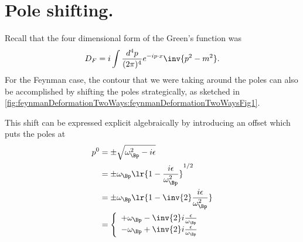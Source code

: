 %
%
\section{Pole shifting.}

Recall that the four dimensional form of the Green's function was
\begin{equation}\label{eqn:qftLecture13:400}
D_F = i \int \frac{d^4 p}{(2 \pi)^4} e^{-i p \cdot x} \inv{ p^2 - m^2 }.
\end{equation}
For the Feynman case, the contour that we were taking around the poles can also be accomplished by shifting the poles strategically, as sketched in \cref{fig:feynmanDeformationTwoWays:feynmanDeformationTwoWaysFig1}.


This shift can be expressed explicit algebraically by introducing an offset
which puts the poles at
\begin{equation}\label{eqn:qftLecture13:440}
\begin{aligned}
p^0
&= \pm \sqrt{ \omega_\Bp^2 - i \epsilon }
\\&= \pm \omega_\Bp \lr{ 1 - \frac{i \epsilon}{\omega_\Bp^2} }^{1/2}
\\&= \pm \omega_\Bp \lr{ 1 - \inv{2} \frac{i \epsilon}{\omega_\Bp^2} }
\\&=
\left\{
\begin{array}{l}
+\omega_\Bp - \inv{2} i \frac{\epsilon}{\omega_\Bp} \\
-\omega_\Bp + \inv{2} i \frac{\epsilon}{\omega_\Bp} \\
\end{array}
\right.
\end{aligned}
\end{equation}

